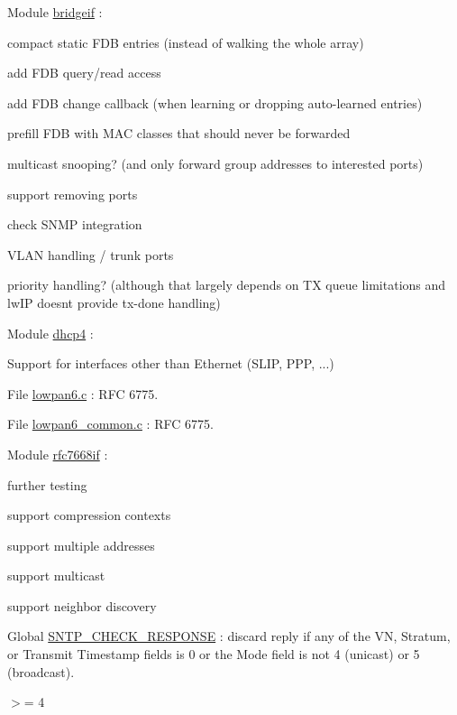
\begin{DoxyRefList}
\item[Module \mbox{\hyperlink{group__bridgeif}{bridgeif}} ]\label{todo__todo000007}%
%
\+:
\begin{DoxyItemize}
\item compact static FDB entries (instead of walking the whole array)
\item add FDB query/read access
\item add FDB change callback (when learning or dropping auto-\/learned entries)
\item prefill FDB with MAC classes that should never be forwarded
\item multicast snooping? (and only forward group addresses to interested ports)
\item support removing ports
\item check SNMP integration
\item VLAN handling / trunk ports
\item priority handling? (although that largely depends on TX queue limitations and lw\+IP doesn\textquotesingle{}t provide tx-\/done handling)  
\end{DoxyItemize}
\item[Module \mbox{\hyperlink{group__dhcp4}{dhcp4}} ]\label{todo__todo000005}%
%
\+:
\begin{DoxyItemize}
\item Support for interfaces other than Ethernet (SLIP, PPP, ...) 
\end{DoxyItemize}
\item[File \mbox{\hyperlink{lowpan6_8c}{lowpan6.c}} ]\label{todo__todo000008}%
%
\+: RFC 6775.  
\item[File \mbox{\hyperlink{lowpan6__common_8c}{lowpan6\+\_\+common.c}} ]\label{todo__todo000010}%
%
\+: RFC 6775.  
\item[Module \mbox{\hyperlink{group__rfc7668if}{rfc7668if}} ]\label{todo__todo000009}%
%
\+:
\begin{DoxyItemize}
\item further testing
\item support compression contexts
\item support multiple addresses
\item support multicast
\item support neighbor discovery  
\end{DoxyItemize}
\item[Global \mbox{\hyperlink{group__sntp__opts_ga7d4e12d90912d486e64f289d7f3ca446}{SNTP\+\_\+\+CHECK\+\_\+\+RESPONSE}} ]\label{todo__todo000006}%
%
\+: discard reply if any of the VN, Stratum, or Transmit Timestamp fields is 0 or the Mode field is not 4 (unicast) or 5 (broadcast).
\begin{DoxyItemize}
\item \texorpdfstring{$>$}{>}= 4 
\end{DoxyItemize}




\end{DoxyRefList}
